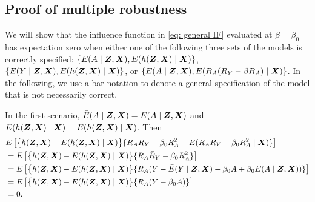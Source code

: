 \documentclass[12pt]{article}
\begin{document}
{\subsection{Proof of multiple robustness}
We will show that the influence function in \eqref{eq: general IF} evaluated at $ \beta=\beta_0 $ has expectation zero  when either one of the following three sets of the models is correctly specified: $ \{E(A\mid\bm{Z}, \bm{X}),  E(h(\bm{Z}, \bm{X})\mid\bm{X})\}$, $ \{E(Y\mid\bm{Z}, \bm{X}),  E(h(\bm{Z}, \bm{X})\mid\bm{X})\}$,  or $ \{E(A\mid\bm{Z}, \bm{X}),  E( R_A ( R_Y- \beta R_A) \mid \bm{X})\}$. In the following, we use a bar notation to denote a general specification of the model that is not necessarily correct.


 In the first scenario,   $ \bar E(A\mid \bm{Z}, \bm{X}) =  E(A\mid \bm{Z}, \bm{X}) $ and $ \bar E(h(\bm{Z}, \bm{X})\mid \bm{X})  =   E(h(\bm{Z}, \bm{X})\mid \bm{X})   $. Then 
 \begin{align*}
 &E\left[	\big\{h(\bm{Z}, \bm{X})- E(h(\bm{Z}, \bm{X})\mid\bm{X})\big\} \{R_A \bar R_Y - \beta_0 R_A^2- \bar E(R_A \bar R_Y  - \beta_0 R_A ^2 \mid \bm{X} )\} \right] \\
 &= E\left[	\big\{h(\bm{Z}, \bm{X})- E(h(\bm{Z}, \bm{X})\mid\bm{X})\big\} \{R_A \bar R_Y - \beta_0 R_A^2 \}  \right] \\ 
 &= E\left[	\big\{h(\bm{Z}, \bm{X})- E(h(\bm{Z}, \bm{X})\mid\bm{X})\big\} \{R_A (Y-  \bar E(Y\mid \bm Z, \bm{X} ) -\beta_0 A  + \beta_0 E(A\mid \bm{Z}, \bm{X}) ) \}  \right] \\ 
 &= E\left[	\big\{h(\bm{Z}, \bm{X})- E(h(\bm{Z}, \bm{X})\mid\bm{X})\big\} \{R_A (Y-\beta_0 A  ) \}  \right] \\
 &= 0 .
 \end{align*}

}
\end{document}
